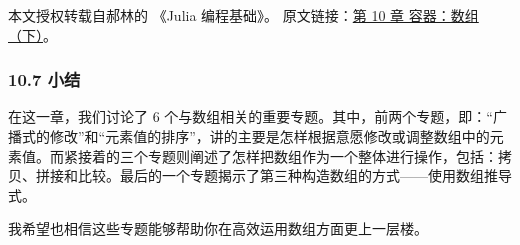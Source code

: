 
本文授权转载自郝林的 《Julia 编程基础》。 原文链接：\href{https://github.com/hyper0x/JuliaBasics/blob/master/book/ch10.md}{第 10 章 容器：数组（下）}。


\subsubsection{10.7 小结}

在这一章，我们讨论了 6 个与数组相关的重要专题。其中，前两个专题，即：“广播式的修改”和“元素值的排序”，讲的主要是怎样根据意愿修改或调整数组中的元素值。而紧接着的三个专题则阐述了怎样把数组作为一个整体进行操作，包括：拷贝、拼接和比较。最后的一个专题揭示了第三种构造数组的方式——使用数组推导式。

我希望也相信这些专题能够帮助你在高效运用数组方面更上一层楼。